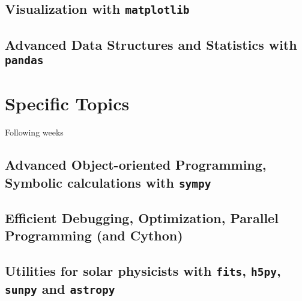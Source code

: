 \documentclass[10pt,a4paper]{article}
\begin{document}
		\subsection{Visualization with \texttt{matplotlib}}
		\subsection{Advanced Data Structures and Statistics with \texttt{pandas}}
	
	\vspace{1cm}
	\section{Specific Topics}
	Following weeks
		
		\subsection{Advanced Object-oriented Programming, Symbolic calculations with \texttt{sympy}}
		\subsection{Efficient Debugging, Optimization, Parallel Programming (and Cython)}
		\subsection{Utilities for solar physicists with \texttt{fits}, \texttt{h5py}, \texttt{sunpy} and \texttt{astropy}}
		
	\thispagestyle{empty}
\end{document}
